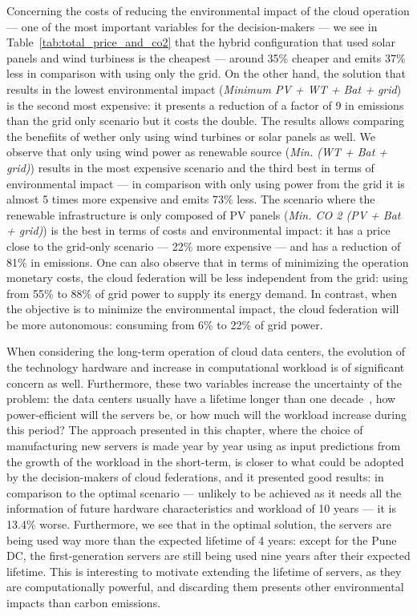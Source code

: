 Concerning the costs of reducing the environmental impact of the cloud operation --- one of the most important variables for the decision-makers --- we see in Table~\ref {tab:total_price_and_co2} that the hybrid configuration that used solar panels and wind turbiness is the cheapest ---  around 35\% cheaper and emits 37\% less  in comparison with using only the grid.  On the other hand, the solution that results in the lowest environmental impact (\textit{Minimum  PV + WT + Bat + grid}) is the second most expensive: it presents a reduction of a factor of 9 in  emissions than the grid only scenario but it costs the double. The results allows comparing the benefiits of wether only using wind turbines or solar panels as well. We observe that only using wind power as renewable source (\textit{Min.  (WT + Bat + grid)}) results in the most expensive scenario and the third best in terms of environmental impact --- in comparison with only using power from the grid it is almost 5 times more expensive and emits 73\% less. The scenario where the renewable infrastructure is only composed of PV panels (\textit{Min. CO 2 (PV + Bat + grid)}) is the best in terms of costs and environmental impact: it has a price close to the grid-only scenario --- 22\% more expensive --- and has a reduction of 81\% in  emissions. One can also observe that in terms of minimizing the operation monetary costs, the cloud federation will be less independent from the grid: using from 55\% to 88\% of grid power to supply its energy demand. In contrast, when the objective is to minimize the environmental impact, the cloud federation will be more autonomous: consuming from 6\% to 22\% of grid power. 

When considering the long-term operation of cloud data centers, the evolution of the technology hardware and increase in computational workload is of significant concern as well. Furthermore, these two variables increase the uncertainty of the problem: the data centers usually have a lifetime longer than one decade~\cite{datacenter_as_computer}, how power-efficient will the servers be, or how much will the workload increase during this period? The approach presented in this chapter, where the choice of manufacturing new servers is made year by year using as input predictions from the growth of the workload in the short-term, is closer to what could be adopted by the decision-makers of cloud federations, and it presented good results: in comparison to the optimal scenario --- unlikely to be achieved as it needs all the information of future hardware characteristics and workload of 10 years --- it is 13.4\% worse. Furthermore, we see that in the optimal solution, the servers are being used way more than the expected lifetime of 4 years: except for the Pune DC, the first-generation servers are still being used nine years after their expected lifetime. This is interesting to motivate extending the lifetime of servers, as they are computationally powerful, and discarding them presents other environmental impacts than carbon emissions. 

